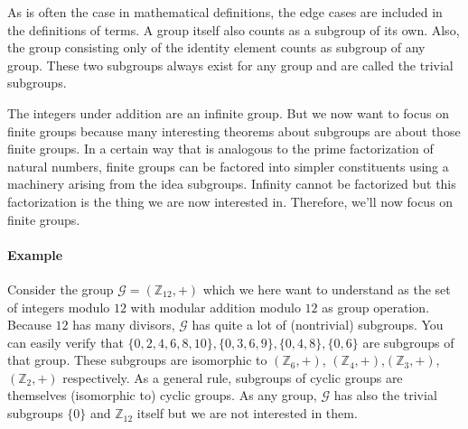 \medskip
As is often the case in mathematical definitions, the edge cases are included in the definitions of terms. A group itself also counts as a subgroup of its own. Also, the group consisting only of the identity element counts as subgroup of any group. These two subgroups always exist for any group and are called the trivial subgroups.

\medskip
The integers under addition are an infinite group. But we now want to focus on finite groups because many interesting theorems about subgroups are about those finite groups. In a certain way that is analogous to the prime factorization of natural numbers, finite groups can be factored into simpler constituents using a machinery arising from the idea subgroups. Infinity cannot be factorized but this factorization is the thing we are now interested in. Therefore, we'll now focus on finite groups.

\paragraph{Example}
Consider the group $\mathcal{G} = (\mathbb{Z}_{12}, +)$ which we here want to understand as the set of integers modulo $12$ with modular addition modulo $12$ as group operation. Because $12$ has many divisors, $\mathcal{G}$ has quite a lot of (nontrivial) subgroups. You can easily verify that $\{0,2,4,6,8,10\}, \{0,3,6,9\}, \{0,4,8\}, \{0,6\}$ are subgroups of that group. These subgroups are isomorphic to $(\mathbb{Z}_{6}, +)$, $(\mathbb{Z}_{4}, +)$,$(\mathbb{Z}_{3}, +)$, $(\mathbb{Z}_{2}, +)$ respectively. As a general rule, subgroups of cyclic groups are themselves (isomorphic to) cyclic groups. As any group, $\mathcal{G}$ has also the trivial subgroups $\{ 0 \}$ and $\mathbb{Z}_{12}$ itself but we are not interested in them. 





